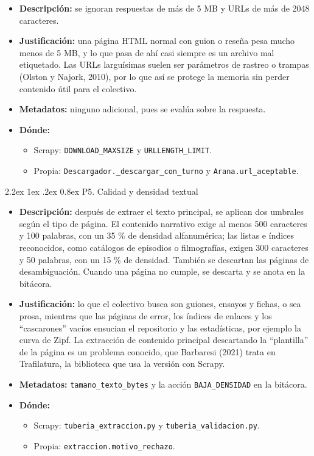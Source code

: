 \documentclass[11pt,spanish]{article}
\makeatletter
\renewcommand\paragraph{\@startsection{paragraph}{4}{\z@}%
  {2.2ex \@plus1ex \@minus.2ex}%
  {0.8ex}%
  {\normalfont\normalsize\bfseries}}
\makeatother
\begin{document}
\begin{itemize}[label=\textbullet, leftmargin=*]
    \item \textbf{Descripción:} se ignoran respuestas de más de 5 MB y URLs de más de 2048 caracteres.
    \item \textbf{Justificación:} una página HTML normal con guion o reseña pesa mucho menos de 5 MB, y lo que pasa de ahí casi siempre es un archivo mal etiquetado. Las URLs larguísimas suelen ser parámetros de rastreo o trampas (Olston y Najork, 2010), por lo que así se protege la memoria sin perder contenido útil para el colectivo.
    \item \textbf{Metadatos:} ninguno adicional, pues se evalúa sobre la respuesta.
    \item \textbf{Dónde:}
    \begin{itemize}[label=--, leftmargin=*]
        \item Scrapy: \texttt{DOWNLOAD\_MAXSIZE} y \texttt{URLLENGTH\_LIMIT}.
        \item Propia: \texttt{Descargador.\_descargar\_con\_turno} y \texttt{Arana.url\_aceptable}.
    \end{itemize}
\end{itemize}

\paragraph{P5. Calidad y densidad textual}

\begin{itemize}[label=\textbullet, leftmargin=*]
    \item \textbf{Descripción:} después de extraer el texto principal, se aplican dos umbrales según el tipo de página. El contenido narrativo exige al menos 500 caracteres y 100 palabras, con un 35 \% de densidad alfanumérica; las listas e índices reconocidos, como catálogos de episodios o filmografías, exigen 300 caracteres y 50 palabras, con un 15 \% de densidad. También se descartan las páginas de desambiguación. Cuando una página no cumple, se descarta y se anota en la bitácora.
    \item \textbf{Justificación:} lo que el colectivo busca son guiones, ensayos y fichas, o sea prosa, mientras que las páginas de error, los índices de enlaces y los ``cascarones'' vacíos ensucian el repositorio y las estadísticas, por ejemplo la curva de Zipf. La extracción de contenido principal descartando la ``plantilla'' de la página es un problema conocido, que Barbaresi (2021) trata en Trafilatura, la biblioteca que usa la versión con Scrapy.
    \item \textbf{Metadatos:} \texttt{tamano\_texto\_bytes} y la acción \texttt{BAJA\_DENSIDAD} en la bitácora.
    \item \textbf{Dónde:}
    \begin{itemize}[label=--, leftmargin=*]
        \item Scrapy: \texttt{tuberia\_extraccion.py} y \texttt{tuberia\_validacion.py}.
        \item Propia: \texttt{extraccion.motivo\_rechazo}.
    \end{itemize}
\end{itemize}
\end{document}
